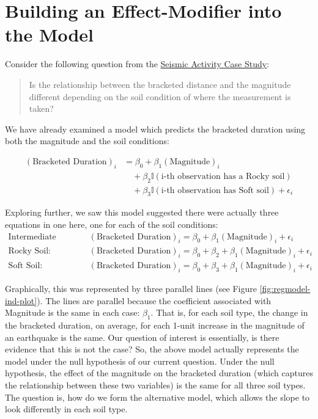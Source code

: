 \documentclass[]{book}
\theoremstyle{definition}
\theoremstyle{definition}
\theoremstyle{definition}
\theoremstyle{remark}
\begin{document}
\section{Building an Effect-Modifier into the
Model}\label{building-an-effect-modifier-into-the-model}

Consider the following question from the
\protect\hyperlink{CaseGreece}{Seismic Activity Case Study}:

\begin{quote}
Is the relationship between the bracketed distance and the magnitude
different depending on the soil condition of where the measurement is
taken?
\end{quote}

We have already examined a model which predicts the bracketed duration
using both the magnitude and the soil conditions:

\[
\begin{aligned}
  (\text{Bracketed Duration})_i &= \beta_0 + \beta_1(\text{Magnitude})_i \\
    &\quad + \beta_2\mathbb{I}(\text{i-th observation has a Rocky soil}) \\
    &\quad + \beta_3\mathbb{I}(\text{i-th observation has Soft soil}) + \epsilon_i
\end{aligned}
\]

Exploring further, we saw this model suggested there were actually three
equations in one here, one for each of the soil conditions: \[
\begin{aligned}
  \text{Intermediate Soil:} &\quad (\text{Bracketed Duration})_i = \beta_0 + \beta_1(\text{Magnitude})_i + \epsilon_i\\
  \text{Rocky Soil:} &\quad (\text{Bracketed Duration})_i = \beta_0 + \beta_2 + \beta_1(\text{Magnitude})_i + \epsilon_i\\
  \text{Soft Soil:} &\quad (\text{Bracketed Duration})_i = \beta_0 + \beta_3 + \beta_1(\text{Magnitude})_i + \epsilon_i
\end{aligned}
\]

Graphically, this was represented by three parallel lines (see Figure
\ref{fig:regmodel-ind-plot}). The lines are parallel because the
coefficient associated with Magnitude is the same in each case:
\(\beta_1\). That is, for each soil type, the change in the bracketed
duration, on average, for each 1-unit increase in the magnitude of an
earthquake is the same. Our question of interest is essentially, is
there evidence that this is not the case? So, the above model actually
represents the model under the null hypothesis of our current question.
Under the null hypothesis, the effect of the magnitude on the bracketed
duration (which captures the relationship between these two variables)
is the same for all three soil types. The question is, how do we form
the alternative model, which allows the slope to look differently in
each soil type.
\end{document}
